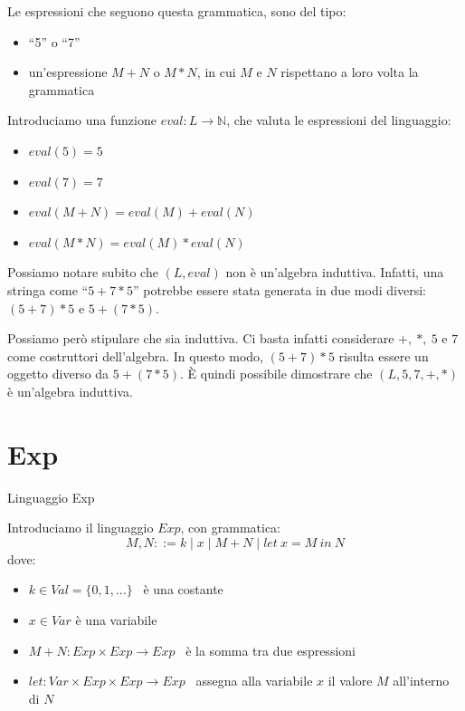 \documentclass[a4paper,11pt]{report}
\begin{document}
Le espressioni che seguono questa grammatica, sono del tipo:
\begin{itemize}
    \item ``5'' o ``7'' 
    \item un'espressione \( M+N \) o \( M*N \), in cui \( M \) e \( N \) rispettano a loro volta la grammatica
\end{itemize}

Introduciamo una funzione \( eval : L \to \mathbb{N}\), che valuta le espressioni del linguaggio:
\begin{itemize}
    \item \(eval(5) = 5\)
    \item \( eval(7) = 7 \)
    \item \( eval(M+N) = eval(M)+eval(N)\)
    \item \( eval(M*N) = eval(M)*eval(N)\)
\end{itemize}

Possiamo notare subito che \( (L, eval) \) non è un'algebra induttiva. Infatti, una stringa come ``\( 5 + 7 * 5 \)'' potrebbe essere stata generata in due modi diversi: \( (5 + 7) * 5 \) e \( 5 + (7 * 5) \). 

Possiamo però stipulare che sia induttiva. Ci basta infatti considerare \( +, \ *, \ 5\) e \( 7 \) come costruttori dell'algebra. In questo modo, \( (5 + 7) * 5 \) risulta essere un oggetto diverso da \( 5 + (7 * 5) \). È quindi possibile dimostrare che \( (L, 5, 7, +, *) \) è un'algebra induttiva.

\section{Exp}

\begin{defframe}{Linguaggio Exp}{}

    Introduciamo il linguaggio \( Exp \), con grammatica:
    \[
        M, N ::= k \mid x \mid M + N \mid let \ x = M \ in \ N
    \]
    dove:

    \begin{itemize}
        \item \( k \in Val=\{0, 1, \dots\}\) \ è una costante
        \item \( x \in Var \) è una variabile     
        \item \( M + N : Exp \times Exp \to Exp \) \ è la somma tra due espressioni
        \item \(  let : Var \times Exp \times Exp \to Exp\) \ assegna alla variabile \( x \)
            il valore \( M \) all'interno di \( N \)
    \end{itemize}

\end{defframe}
\end{document}
